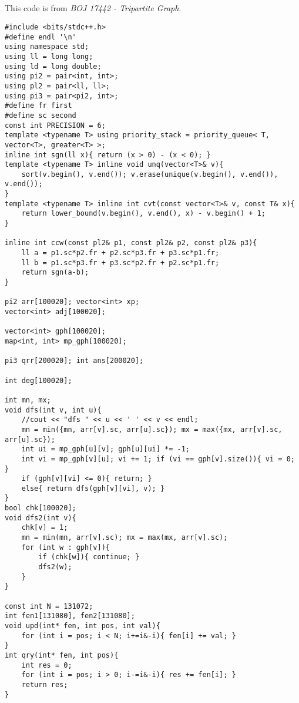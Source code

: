 \documentclass[landscape, 8pt, a4paper, oneside, twocolumn]{extarticle}
\begin{document}
\subsection{}
This code is from \textit{BOJ 17442 - Tripartite Graph}.
\begin{verbatim}
#include <bits/stdc++.h>
#define endl '\n'
using namespace std;
using ll = long long;
using ld = long double;
using pi2 = pair<int, int>;
using pl2 = pair<ll, ll>;
using pi3 = pair<pi2, int>;
#define fr first
#define sc second
const int PRECISION = 6;
template <typename T> using priority_stack = priority_queue< T, vector<T>, greater<T> >;
inline int sgn(ll x){ return (x > 0) - (x < 0); }
template <typename T> inline void unq(vector<T>& v){
    sort(v.begin(), v.end()); v.erase(unique(v.begin(), v.end()), v.end());
}
template <typename T> inline int cvt(const vector<T>& v, const T& x){
    return lower_bound(v.begin(), v.end(), x) - v.begin() + 1;
}

inline int ccw(const pl2& p1, const pl2& p2, const pl2& p3){
    ll a = p1.sc*p2.fr + p2.sc*p3.fr + p3.sc*p1.fr;
    ll b = p1.sc*p3.fr + p3.sc*p2.fr + p2.sc*p1.fr;
    return sgn(a-b);
}

pi2 arr[100020]; vector<int> xp;
vector<int> adj[100020];

vector<int> gph[100020];
map<int, int> mp_gph[100020];

pi3 qrr[200020]; int ans[200020];

int deg[100020];

int mn, mx;
void dfs(int v, int u){
    //cout << "dfs " << u << ' ' << v << endl;
    mn = min({mn, arr[v].sc, arr[u].sc}); mx = max({mx, arr[v].sc, arr[u].sc});
    int ui = mp_gph[u][v]; gph[u][ui] *= -1;
    int vi = mp_gph[v][u]; vi += 1; if (vi == gph[v].size()){ vi = 0; }
    if (gph[v][vi] <= 0){ return; }
    else{ return dfs(gph[v][vi], v); }
}
bool chk[100020];
void dfs2(int v){
    chk[v] = 1;
    mn = min(mn, arr[v].sc); mx = max(mx, arr[v].sc);
    for (int w : gph[v]){
        if (chk[w]){ continue; }
        dfs2(w);
    }
}

const int N = 131072;
int fen1[131080], fen2[131080];
void upd(int* fen, int pos, int val){
    for (int i = pos; i < N; i+=i&-i){ fen[i] += val; }
}
int qry(int* fen, int pos){
    int res = 0;
    for (int i = pos; i > 0; i-=i&-i){ res += fen[i]; }
    return res;
}


\end{verbatim}
\end{document}
